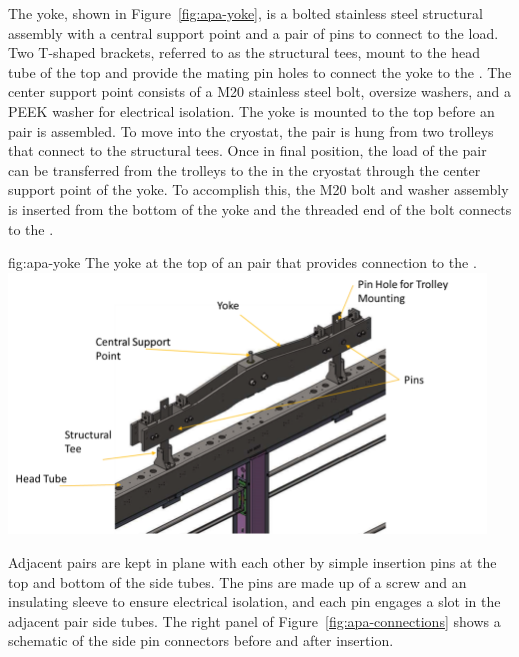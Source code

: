 The  yoke, shown in Figure~\ref{fig:apa-yoke}, is a bolted stainless steel structural assembly with a central support point and a pair of pins to connect to the load.  Two T-shaped brackets, referred to as the structural tees, mount to the head tube of the top  and provide the mating pin holes to connect the yoke to the .  The center support point consists of a M20 stainless steel bolt, oversize washers, and a PEEK washer for electrical isolation.   The yoke is mounted to the top  before an  pair %
is assembled.  To move into the cryostat, the pair %
is hung from two trolleys that connect to the structural tees. Once in final position, the load of the  pair %
can be transferred from the trolleys to the  in the cryostat through the center support point of the yoke.  To accomplish this, the M20 bolt and washer assembly is inserted from the bottom of the yoke and the threaded end of the bolt connects to the .

\begin{dunefigure}{fig:apa-yoke} %
{The yoke at the top of an  pair %
that provides connection to the .}
\includegraphics[width=0.95\textwidth]{graphics/sp-apa-yoke-labels.png} 
\end{dunefigure}

Adjacent  pairs %
are kept in plane with each other by simple insertion pins at the top and bottom of the side tubes.  The pins are made up of a screw and an insulating sleeve to ensure electrical isolation, and each pin engages a slot in the adjacent  pair %
side tubes. The right panel of Figure~\ref{fig:apa-connections} shows a schematic of the side pin connectors before and after insertion.  


